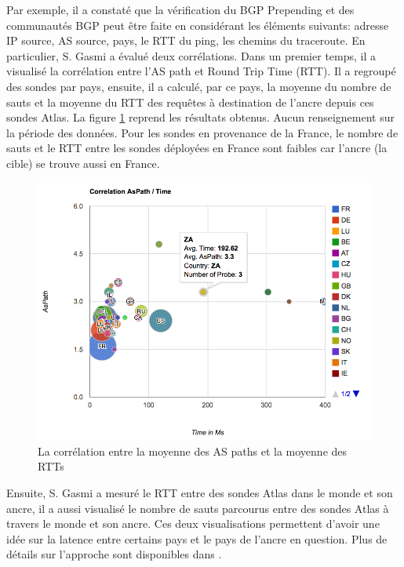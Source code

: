 Par exemple, il a constaté que la vérification du BGP Prepending et des communautés BGP peut être faite en  considérant les éléments suivants: adresse IP source, AS source, pays, le RTT du ping, les chemins du traceroute. En particulier, S. Gasmi a évalué deux corrélations. Dans un premier temps, il a visualisé la corrélation entre l'AS path et Round Trip Time (RTT). Il a regroupé des sondes par pays, ensuite, il a calculé, par ce pays, la moyenne du nombre de sauts et la moyenne du RTT des requêtes à destination de l'ancre depuis ces sondes Atlas.
La figure \ref{fig:1-AS-Path-Time-correlationv} reprend les résultats obtenus. Aucun renseignement sur la période des données. Pour les sondes en provenance de la France,  le nombre de sauts et le RTT entre les sondes déployées en France sont faibles car l'ancre (la cible) se trouve aussi en France.
\begin{figure}[H]
	\centering
	\captionsetup{justification=centering}
	\includegraphics[width=1\linewidth]{illustrations/1-AS-Path-Time-correlation}
	\caption{La corrélation entre la moyenne des AS paths et la moyenne des RTTs \cite{Salim-Gasmi}}
	\label{fig:1-AS-Path-Time-correlationv}
\end{figure}


Ensuite, S. Gasmi a mesuré le RTT entre des sondes Atlas dans le monde et son ancre, il a aussi visualisé le nombre de sauts parcourus entre des sondes Atlas à travers le monde et son ancre. Ces deux visualisations permettent d'avoir une idée sur la latence entre certains pays et le pays de l'ancre en question. Plus de détails sur l'approche sont disponibles dans \cite{Salim-Gasmi}.


